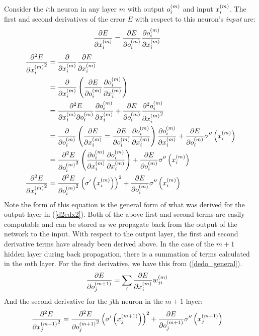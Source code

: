 \\ 
Consider the $i$th neuron in any layer $m$ with output $o_{i}^{(m)}$ and input $x_{i}^{(m)}$. The first and second derivatives of the error $E$ with respect to this neuron's \textit{input} are: 
\begin{align}
\pdv{E}{x_{i}^{(m)}} &= 
\pdv{E}{o_{i}^{(m)}}
\pdv{o_{i}^{(m)}}{x_{i}^{(m)}}\label{dedx_general}
\end{align}
\begin{align}
\pdv[2]{E}{{x_{i}^{(m)}}} &= 
\pdv{}{{x_{i}^{(m)}}}
\pdv{E}{{x_{i}^{(m)}}} 
\\
&= \pdv{}{x_{i}^{(m)}}
\left(
\pdv{E}{o_{i}^{(m)}}
\pdv{o_{i}^{(m)}}{x_{i}^{(m)}}
\right)
\\
&= \pdv{E}{x_{i}^{(m)}}{o_{i}^{(m)}}
\pdv{o_{i}^{(m)}}{x_{i}^{(m)}}
+
\pdv{E}{o_{i}^{(m)}}\pdv[2]{{o_{i}^{(m)}}}{{x_{i}^{(m)}}}
\\
&=\pdv{}{{o_{i}^{(m)}}}
\left(\pdv{E}{x_{i}^{(m)}} = \pdv{E}{{o_{i}^{(m)}}}\pdv{{o_{i}^{(m)}}}{{x_{i}^{(m)}}}\right)
\pdv{{o_{i}^{(m)}}}{{x_{i}^{(m)}}}
+
\pdv{E}{o_{i}^{(m)}}\sigma^{\prime\prime}\left(x_{i}^{(m)}\right)
\\
&=\pdv[2]{E}{{o_{i}^{(m)}}}
\left
(\pdv{{o_{i}^{(m)}}}{{x_{i}^{(m)}}}
\pdv{{o_{i}^{(m)}}}{{x_{i}^{(m)}}}
\right)
+
\pdv{E}{o_{i}^{(m)}}\sigma^{\prime\prime}\left(x_{i}^{(m)}\right)
\\
\pdv[2]{E}{{x_{i}^{(m)}}} &= 
\pdv[2]{E}{{o_{i}^{(m)}}} \left(\sigma^{\prime}\left({x_{i}^{(m)}}\right)\right)^2
+
\pdv{E}{{o_{i}^{(m)}}}\sigma^{\prime\prime}\left(x_{i}^{(m)}\right)
\end{align}
Note the form of this equation is the general form of what was derived for the output layer in (\ref{d2edx2}). Both of the above first and second terms are easily computable and can be stored as we propagate back from the output of the network to the input. With respect to the output layer, the first and second derivative terms have already been derived above. In the case of the $m + 1$ hidden layer during back propagation, there is a summation of terms calculated in the $m$th layer. For the first derivative, we have this from (\ref{dedo_general}).
\begin{align}
\pdv{E}{o_{j}^{(m+1)}} &= \sum_i\pdv{E}{x_{i}^{(m)}}w_{ji}^{(m)}
\end{align}
And the second derivative for the $j$th neuron in the $m+1$ layer:
\begin{align}
\pdv[2]{E}{{x_{j}^{(m+1)}}} &= 
\pdv[2]{E}{{o_{j}^{(m+1)}}}
\left(\sigma^{\prime}\left({x_{j}^{(m+1)}}\right)\right)^2
+
\pdv{E}{{o_{j}^{(m+1)}}}\sigma^{\prime\prime}\left(x_{j}^{(m+1)}\right)
\end{align}

